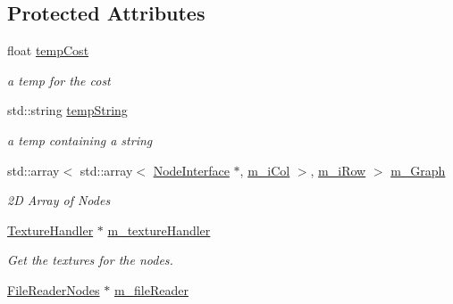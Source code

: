 \subsection*{Protected Attributes}
\begin{DoxyCompactItemize}
\item 
\mbox{\label{class_graph_a3fd8940b448e540391fc0510fcaa3d42}} 
float \mbox{\hyperlink{class_graph_a3fd8940b448e540391fc0510fcaa3d42}{temp\+Cost}}
\begin{DoxyCompactList}\small\item\em a temp for the cost \end{DoxyCompactList}\item 
\mbox{\label{class_graph_a7daeb04b06c3e9aa9c3060b3c1b020c3}} 
std\+::string \mbox{\hyperlink{class_graph_a7daeb04b06c3e9aa9c3060b3c1b020c3}{temp\+String}}
\begin{DoxyCompactList}\small\item\em a temp containing a string \end{DoxyCompactList}\item 
\mbox{\label{class_graph_a7c44dfa4f34c911eec1076d255c6fd10}} 
std\+::array$<$ std\+::array$<$ \mbox{\hyperlink{class_node_interface}{Node\+Interface}} $\ast$, \mbox{\hyperlink{class_graph_aaf5b79ca84f573eb07c1b2a0f2baec25}{m\+\_\+i\+Col}} $>$, \mbox{\hyperlink{class_graph_aefa8c02f516b89b5a9e5361f1ba48786}{m\+\_\+i\+Row}} $>$ \mbox{\hyperlink{class_graph_a7c44dfa4f34c911eec1076d255c6fd10}{m\+\_\+\+Graph}}
\begin{DoxyCompactList}\small\item\em 2D Array of Nodes \end{DoxyCompactList}\item 
\mbox{\label{class_graph_abf383bcf1a1426860ff8c89a1ba0e1ef}} 
\mbox{\hyperlink{class_texture_handler}{Texture\+Handler}} $\ast$ \mbox{\hyperlink{class_graph_abf383bcf1a1426860ff8c89a1ba0e1ef}{m\+\_\+texture\+Handler}}
\begin{DoxyCompactList}\small\item\em Get the textures for the nodes. \end{DoxyCompactList}\item 
\mbox{\label{class_graph_a688da5c14a6fdb07e3c477af438f8e52}} 
\mbox{\hyperlink{class_file_reader_nodes}{File\+Reader\+Nodes}} $\ast$ \mbox{\hyperlink{class_graph_a688da5c14a6fdb07e3c477af438f8e52}{m\+\_\+file\+Reader}}

\end{DoxyCompactItemize}
